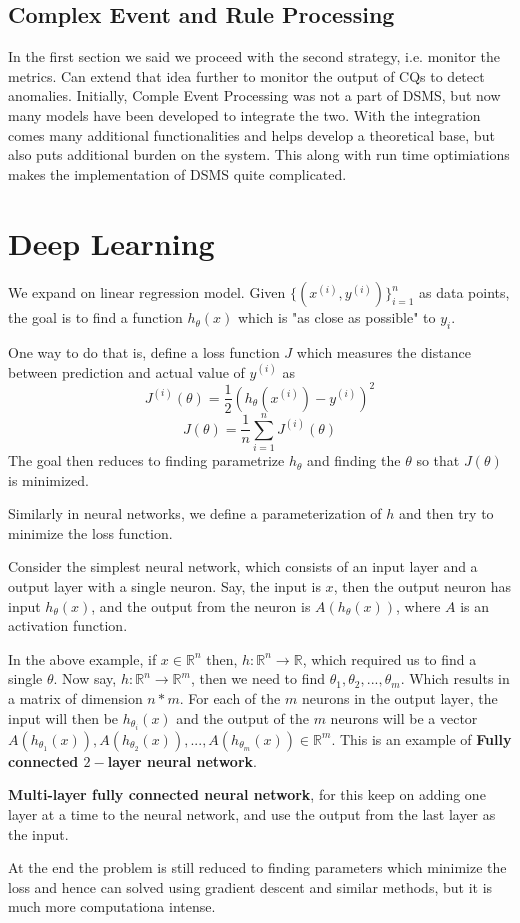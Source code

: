 \subsection{Complex Event and Rule Processing}
In the first section we said we proceed with the second strategy, i.e. monitor the metrics. Can extend that idea further to monitor the output of CQs to detect anomalies. Initially, Comple Event Processing was not a part of DSMS, but now many models have been developed to integrate the two. With the integration comes many additional functionalities and helps develop a theoretical base, but also puts additional burden on the system. This along with run time optimiations makes the implementation of DSMS quite complicated.

\section{Deep Learning}
We expand on linear regression model. Given $\{(x^{(i)},y^{(i)})\}_{i=1}^{n}$ as data points, the goal is to find a function $h_{\theta}(x)$ which is "as close as possible" to $y_i$.
\par One way to do that is, define a loss function $J$ which measures the distance between prediction and actual value of $y^{(i)}$ as
$$J^{(i)}(\theta)=\frac{1}{2}(h_{\theta}(x^{(i)})-y^{(i)})^{2}$$
$$J(\theta)=\frac{1}{n}\sum_{i=1}^{n}J^{(i)}(\theta)$$
The goal then reduces to finding parametrize $h_{\theta}$ and finding the $\theta$ so that $J(\theta)$ is minimized.
\par Similarly in neural networks, we define a parameterization of $h$ and then try to minimize the loss function.
\par Consider the simplest neural network, which consists of an input layer and a output layer with a single neuron. Say, the input is $x$, then the output neuron has input $h_{\theta}(x)$, and the output from the neuron is $A(h_{\theta}(x))$, where $A$ is an activation function.
\par In the above example, if $x\in\mathbb{R}^{n}$ then, $h:\mathbb{R}^{n}\rightarrow\mathbb{R}$, which required us to find a single $\theta$. Now say, $h:\mathbb{R}^{n}\rightarrow\mathbb{R}^{m}$, then we need to find $\theta_{1},\theta_{2},...,\theta_{m}$. Which results in a matrix of dimension $n*m$. For each of the $m$ neurons in the output layer, the input will then be $h_{\theta_{i}}(x)$ and the output of the $m$ neurons will be a vector $A(h_{\theta_{1}}(x)),A(h_{\theta_{2}}(x)),...,A(h_{\theta_{m}}(x)) \in \mathbb{R}^{m}$. This is an example of \textbf{Fully connected $2-$layer neural network}.  
\par \textbf{Multi-layer fully connected neural network}, for this keep on adding one layer at a time to the neural network, and use the output from the last layer as the input.
\par At the end the problem is still reduced to finding parameters which minimize the loss and hence can solved using gradient descent and similar methods, but it is much more computationa intense.

